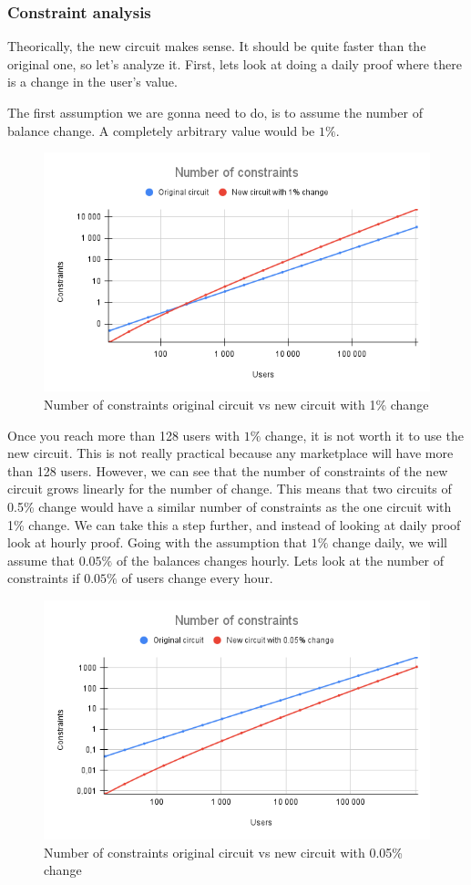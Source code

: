 \subsubsection{Constraint analysis}
Theorically, the new circuit makes sense. It should be quite faster than the original one, so let's analyze it.
First, lets look at doing a daily proof where there is a change in the user's value.

The first assumption we are gonna need to do, is to assume the number of balance change. A completely arbitrary value would be $1\%$.
\begin{figure}[H]
   \centering
   \includegraphics[width=130mm]{Number of constraints.png}
   \caption{Number of constraints original circuit vs new circuit with 1\% change}
   \label{overflow}
   \end{figure}
Once you reach more than 128 users with $1\%$ change, it is not worth it to use the new circuit. 
This is not really practical because any marketplace will have more than 128 users.
However, we can see that the number of constraints of the new circuit grows linearly for the number of change.
This means that two circuits of 0.5\% change would have a similar number of constraints as the one circuit with 1\% change.
We can take this a step further, and instead of looking at daily proof look at hourly proof.
Going with the assumption that $1\%$ change daily, we will assume that $0.05\%$ of the balances changes hourly.
Lets look at the number of constraints if $0.05\%$ of users change every hour.
\begin{figure}[H]
   \centering
   \includegraphics[width=130mm]{Number of constraints .05.png}
   \caption{Number of constraints original circuit vs new circuit with 0.05\% change}
   \label{overflow}
   \end{figure}
